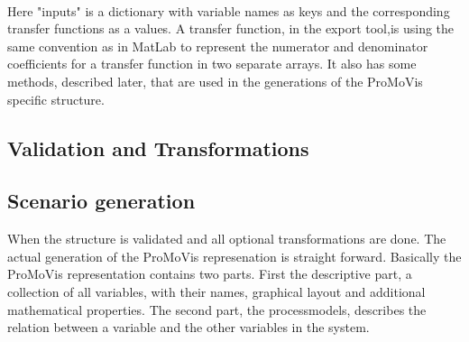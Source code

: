 \setlength\fboxsep{0pt}
\setlength\fboxrule{0.5pt}
\\\newline Here "inputs" is a dictionary with variable names as keys and the corresponding transfer functions as a values. A transfer function, in the export tool,is using the same convention as in MatLab to represent the numerator and denominator coefficients for a transfer function in two separate arrays. It also has some methods, described later, that are used in the generations of the ProMoVis specific structure. 


\subsection{Validation and Transformations}
\subsection{Scenario generation}
When the structure is validated and all optional transformations are done. The actual generation of the ProMoVis represenation is straight forward. Basically the ProMoVis representation contains two parts. First the descriptive part, a collection of all variables, with their names, graphical layout and additional mathematical properties. The second part,  the processmodels, describes the relation between a variable and the other variables in the system. 
